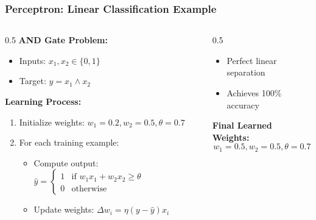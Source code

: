\documentclass[5pt,aspectratio=169]{beamer}
\begin{document}
\begin{frame}
\frametitle{Perceptron: Linear Classification Example}

\begin{columns}[T]
\begin{column}{0.5\textwidth}
\textbf{AND Gate Problem:}
\begin{itemize}
\item Inputs: \(x_1, x_2 \in \{0,1\}\)
\item Target: \(y = x_1 \land x_2\)
\end{itemize}

\textbf{Learning Process:}
\begin{enumerate}
\item Initialize weights: \(w_1=0.2, w_2=0.5, \theta=0.7\)
\item For each training example:
\begin{itemize}
\item Compute output: 
\(\hat{y} = \begin{cases} 
1 & \text{if } w_1x_1 + w_2x_2 \geq \theta \\
0 & \text{otherwise}
\end{cases}\)
\item Update weights: 
\(\Delta w_i = \eta(y - \hat{y})x_i\)
\end{itemize}
\end{enumerate}
\end{column}

\begin{column}{0.5\textwidth}

\begin{itemize}
\item Perfect linear separation
\item Achieves 100\% accuracy
\end{itemize}
\textbf{Final Learned Weights:}
\[ w_1 = 0.5, w_2 = 0.5, \theta = 0.7 \]
\end{column}
\end{columns}
\end{frame}
\end{document}

